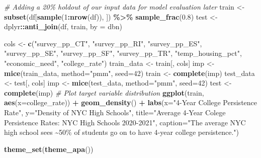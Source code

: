 \documentclass[
  man]{apa6}
\newenvironment{Shaded}{\begin{snugshade}}{\end{snugshade}}
\newcommand{\AttributeTok}[1]{\textcolor[rgb]{0.13,0.29,0.53}{#1}}
\newcommand{\CommentTok}[1]{\textcolor[rgb]{0.56,0.35,0.01}{\textit{#1}}}
\newcommand{\DecValTok}[1]{\textcolor[rgb]{0.00,0.00,0.81}{#1}}
\newcommand{\FloatTok}[1]{\textcolor[rgb]{0.00,0.00,0.81}{#1}}
\newcommand{\FunctionTok}[1]{\textcolor[rgb]{0.13,0.29,0.53}{\textbf{#1}}}
\newcommand{\NormalTok}[1]{#1}
\newcommand{\OtherTok}[1]{\textcolor[rgb]{0.56,0.35,0.01}{#1}}
\newcommand{\SpecialCharTok}[1]{\textcolor[rgb]{0.81,0.36,0.00}{\textbf{#1}}}
\newcommand{\StringTok}[1]{\textcolor[rgb]{0.31,0.60,0.02}{#1}}
\begin{document}
\begin{Shaded}
\begin{Highlighting}[]
\CommentTok{\# Adding a 20\% holdout of our input data for model evaluation later}
\NormalTok{train }\OtherTok{\textless{}{-}} \FunctionTok{subset}\NormalTok{(df[}\FunctionTok{sample}\NormalTok{(}\DecValTok{1}\SpecialCharTok{:}\FunctionTok{nrow}\NormalTok{(df)), ]) }\SpecialCharTok{\%\textgreater{}\%} \FunctionTok{sample\_frac}\NormalTok{(}\FloatTok{0.8}\NormalTok{)}
\NormalTok{test  }\OtherTok{\textless{}{-}}\NormalTok{ dplyr}\SpecialCharTok{::}\FunctionTok{anti\_join}\NormalTok{(df, train, }\AttributeTok{by =} \StringTok{\textquotesingle{}dbn\textquotesingle{}}\NormalTok{)}

\NormalTok{cols }\OtherTok{\textless{}{-}} \FunctionTok{c}\NormalTok{(}\StringTok{"survey\_pp\_CT"}\NormalTok{, }\StringTok{"survey\_pp\_RI"}\NormalTok{,}
          \StringTok{"survey\_pp\_ES"}\NormalTok{, }\StringTok{"survey\_pp\_SE"}\NormalTok{,}
          \StringTok{"survey\_pp\_SF"}\NormalTok{, }\StringTok{"survey\_pp\_TR"}\NormalTok{,}
          \StringTok{"temp\_housing\_pct"}\NormalTok{, }\StringTok{"economic\_need"}\NormalTok{,}
          \StringTok{"college\_rate"}\NormalTok{)}
\NormalTok{train\_data }\OtherTok{\textless{}{-}}\NormalTok{ train[, cols]}
\NormalTok{imp }\OtherTok{\textless{}{-}} \FunctionTok{mice}\NormalTok{(train\_data, }\AttributeTok{method=}\StringTok{"pmm"}\NormalTok{, }\AttributeTok{seed=}\DecValTok{42}\NormalTok{)}
\NormalTok{train }\OtherTok{\textless{}{-}} \FunctionTok{complete}\NormalTok{(imp)}
\NormalTok{test\_data }\OtherTok{\textless{}{-}}\NormalTok{ test[, cols]}
\NormalTok{imp }\OtherTok{\textless{}{-}} \FunctionTok{mice}\NormalTok{(test\_data, }\AttributeTok{method=}\StringTok{"pmm"}\NormalTok{, }\AttributeTok{seed=}\DecValTok{42}\NormalTok{)}
\NormalTok{test }\OtherTok{\textless{}{-}} \FunctionTok{complete}\NormalTok{(imp)}
\CommentTok{\# Plot target variable distribution}
\FunctionTok{ggplot}\NormalTok{(train, }\FunctionTok{aes}\NormalTok{(}\AttributeTok{x=}\NormalTok{college\_rate)) }\SpecialCharTok{+} 
    \FunctionTok{geom\_density}\NormalTok{() }\SpecialCharTok{+} 
    \FunctionTok{labs}\NormalTok{(}\AttributeTok{x=}\StringTok{"4{-}Year College Persistence Rate"}\NormalTok{, }\AttributeTok{y=}\StringTok{"Density of NYC High Schools"}\NormalTok{, }\AttributeTok{title=}\StringTok{"Average 4{-}Year Colege Persistence Rates: NYC High Schools 2020{-}2021"}\NormalTok{, }\AttributeTok{caption=}\StringTok{"The average NYC high school sees \textasciitilde{}50\% of students go on to have 4{-}year college persistence."}\NormalTok{)}

\FunctionTok{theme\_set}\NormalTok{(}\FunctionTok{theme\_apa}\NormalTok{())}


\end{Highlighting}
\end{Shaded}
\end{document}
